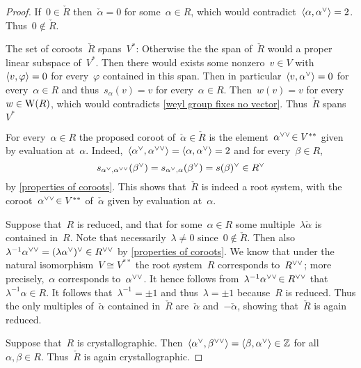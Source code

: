 \begin{proof}
  If~$0 \in \check{R}$ then~$\check{\alpha} = 0$ for some~$\alpha \in R$, which would contradict~$\pair{\alpha, \check{\alpha}} = 2$.
  Thus~$0 \notin \check{R}$.
  
  The set of coroots~$\check{R}$ spans~$V^*$:
  Otherwise the the span of~$\check{R}$ would a proper linear subspace of~$V^*$.
  Then there would exists some nonzero~$v \in V$ with~$\langle v, \varphi\rangle = 0$ for every~$\varphi$ contained in this span.
  Then in particular~$\pair{v, \check{\alpha}} = 0$ for every~$\alpha \in R$ and thus~$s_\alpha(v) = v$ for every~$\alpha \in R$.
  Then~$w(v) = v$ for every~$w \in \operatorname{W}(R)$, which would contradicts \cref{weyl group fixes no vector}.
  Thus~$\check{R}$ spans~$V^*$
  
  For every~$\alpha \in R$ the proposed coroot of~$\check{\alpha} \in \check{R}$ is the element~$\dcheck*{\alpha} \in V^{**}$ given by evaluation at~$\alpha$.
  Indeed,~$\pair{\check{\alpha}, \dcheck{\alpha}} = \pair{\alpha, \check{\alpha}} = 2$ and for every~$\beta \in R$,
  \[
    s_{\check{\alpha}, \dcheck{\alpha}}(\check{\beta})
    =
    s_{\check{\alpha}, \alpha}(\check{\beta})
    =
    \check{s(\beta)}
    \in
    \check{R}
  \]
  by \cref{properties of coroots}.
  This shows that~$\check{R}$ is indeed a root system, with the coroot~$\dcheck*{\alpha} \in V^{**}$ of~$\check{\alpha}$ given by evaluation at~$\alpha$.
  
  Suppose that~$R$ is reduced, and that for some~$\alpha \in R$ some multiple~$\lambda \check{\alpha}$ is contained in~$R$.
  Note that necessarily~$\lambda \neq 0$ since~$0 \notin \check{R}$.
  Then also~$\lambda^{-1} \dcheck{\alpha} = \check{(\lambda\check{\alpha})} \in \dcheck{R}$ by \cref{properties of coroots}.
  We know that under the natural isomorphism~$V \cong V^{**}$ the root system~$R$ corresponds to~$\dcheck{R}$;
  more precisely,~$\alpha$ corresponds to~$\dcheck{\alpha}$.
  It hence follows from~$\lambda^{-1} \dcheck*{\alpha} \in \dcheck{R}$ that~$\lambda^{-1} \alpha \in R$.
  It follows that~$\lambda^{-1} = \pm 1$ and thus~$\lambda = \pm 1$ because~$R$ is reduced.
  Thus the only multiples of~$\check{\alpha}$ contained in~$\check{R}$ are~$\check{\alpha}$ and~$-\check{\alpha}$, showing that~$\check{R}$ is again reduced.
  
  Suppose that~$R$ is crystallographic.
  Then~$\pair{\check{\alpha}, \dcheck{\beta}} = \pair{\beta, \check{\alpha}} \in \Integer$ for all~$\alpha, \beta \in R$.
  Thus~$\check{R}$ is again crystallographic.
\end{proof}


